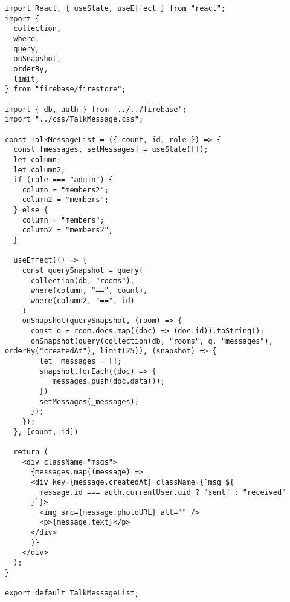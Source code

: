 \begin{verbatim}
import React, { useState, useEffect } from "react";
import {
  collection,
  where,
  query,
  onSnapshot,
  orderBy,
  limit,
} from "firebase/firestore";

import { db, auth } from '../../firebase';
import "../css/TalkMessage.css";

const TalkMessageList = ({ count, id, role }) => {
  const [messages, setMessages] = useState([]);
  let column;
  let column2;
  if (role === "admin") {
    column = "members2";
    column2 = "members";
  } else {
    column = "members";
    column2 = "members2";
  }

  useEffect(() => {
    const querySnapshot = query(
      collection(db, "rooms"),
      where(column, "==", count),
      where(column2, "==", id)
    )
    onSnapshot(querySnapshot, (room) => {
      const q = room.docs.map((doc) => (doc.id)).toString();
      onSnapshot(query(collection(db, "rooms", q, "messages"), orderBy("createdAt"), limit(25)), (snapshot) => {
        let _messages = [];
        snapshot.forEach((doc) => {
          _messages.push(doc.data());
        })
        setMessages(_messages);
      });
    });
  }, [count, id])

  return (
    <div className="msgs">
      {messages.map((message) => 
      <div key={message.createdAt} className={`msg ${
        message.id === auth.currentUser.uid ? "sent" : "received"
      }`}>
        <img src={message.photoURL} alt="" />
        <p>{message.text}</p>
      </div>
      )}
    </div>
  );
}

export default TalkMessageList;
\end{verbatim}